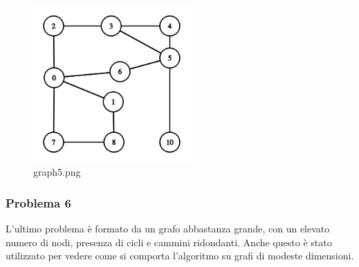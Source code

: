 \documentclass[11pt]{article}
\begin{document}
    \begin{figure}
\centering
\includegraphics[width=6cm, keepaspectratio]{Colored Camel_files/graph5.png}
\caption{graph5.png}
\end{figure}

    \hypertarget{problema-6}{%
\subsubsection{\texorpdfstring{Problema 6
}{Problema 6 }}\label{problema-6}}

    L'ultimo problema è formato da un grafo abbastanza grande, con un
elevato numero di nodi, presenza di cicli e cammini ridondanti. Anche
questo è stato utilizzato per vedere come si comporta l'algoritmo su
grafi di modeste dimensioni.
\end{document}
